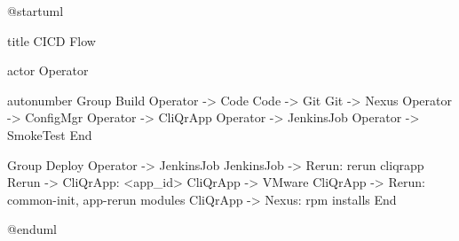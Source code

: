 @startuml

title CICD Flow

actor Operator

autonumber
Group Build
  Operator -> Code
  Code -> Git
  Git -> Nexus
  Operator -> ConfigMgr
  Operator -> CliQrApp
  Operator -> JenkinsJob
  Operator -> SmokeTest
End

Group Deploy
  Operator -> JenkinsJob
  JenkinsJob -> Rerun: rerun cliqrapp
  Rerun -> CliQrApp: <app_id>
  CliQrApp -> VMware
  CliQrApp -> Rerun: common-init, app-rerun modules
  CliQrApp -> Nexus: rpm installs
End



@enduml
